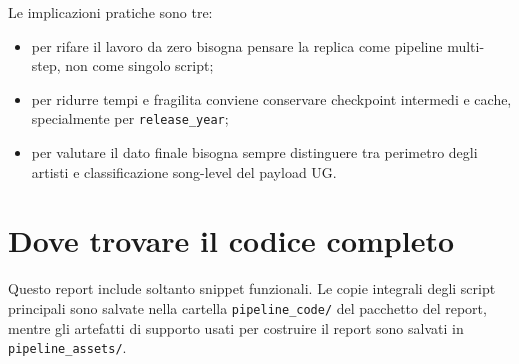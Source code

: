 \documentclass[11pt]{article}
\begin{document}
Le implicazioni pratiche sono tre:
\begin{itemize}[leftmargin=2em]
\item per rifare il lavoro da zero bisogna pensare la replica come pipeline multi-step, non come singolo script;
\item per ridurre tempi e fragilita conviene conservare checkpoint intermedi e cache, specialmente per \texttt{release\_year};
\item per valutare il dato finale bisogna sempre distinguere tra perimetro degli artisti e classificazione song-level del payload UG.
\end{itemize}

\appendix
\clearpage
\section{Dove trovare il codice completo}
Questo report include soltanto snippet funzionali. Le copie integrali degli script principali sono salvate nella cartella \texttt{pipeline\_code/} del pacchetto del report, mentre gli artefatti di supporto usati per costruire il report sono salvati in \texttt{pipeline\_assets/}.
\end{document}
